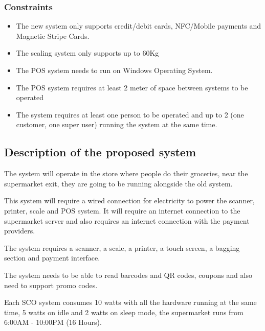 \pagebreak

\subsubsection{Constraints}
\begin{itemize}
    \item The new system only supports credit/debit cards, NFC/Mobile 
    payments and Magnetic Stripe Cards.
    \item The scaling system only supports up to 60Kg
    \item The POS system needs to run on Windows Operating System.
    \item The POS system requires at least 2 meter of space between systems 
    to be operated
    \item The system requires at least one person to be operated and up 
    to 2 (one customer, one super user) running the system at the same time.
\end{itemize}

\subsection{Description of the proposed system}

The system will operate in the store where people do their groceries, 
near the supermarket exit, they are going to be running 
alongside the old system. 
\newline

\noindent
This system will require a wired connection for electricity to power the 
scanner, printer, scale and POS system. It will require an internet connection 
to the supermarket server and also requires an internet connection with the 
payment providers. 
\newline

\noindent
The system requires a scanner, a scale, a printer, a touch screen, a 
bagging section and payment interface. 
\newline

\noindent
The system needs to be able to read barcodes and QR codes, coupons and also 
need to support promo codes. 
\newline

\noindent
Each SCO system consumes 10 watts with all the hardware running at the same 
time, 5 watts on idle and 2 watts on sleep mode, the supermarket 
runs from 6:00AM - 10:00PM (16 Hours). 
\newline

